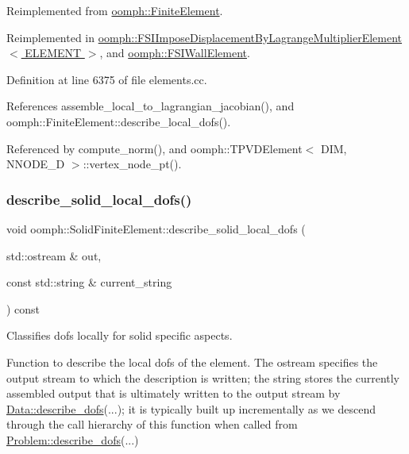 Reimplemented from \hyperlink{classoomph_1_1FiniteElement_aad9f9ebb2996fd9c44caf34da8bc7941}{oomph\+::\+Finite\+Element}.



Reimplemented in \hyperlink{classoomph_1_1FSIImposeDisplacementByLagrangeMultiplierElement_ad53849f509cfd0d3eb469bfacf7cfabf}{oomph\+::\+F\+S\+I\+Impose\+Displacement\+By\+Lagrange\+Multiplier\+Element$<$ E\+L\+E\+M\+E\+N\+T $>$}, and \hyperlink{classoomph_1_1FSIWallElement_afe120348dddfc3acfd95e7d08c2d0a1d}{oomph\+::\+F\+S\+I\+Wall\+Element}.



Definition at line 6375 of file elements.\+cc.



References assemble\+\_\+local\+\_\+to\+\_\+lagrangian\+\_\+jacobian(), and oomph\+::\+Finite\+Element\+::describe\+\_\+local\+\_\+dofs().



Referenced by compute\+\_\+norm(), and oomph\+::\+T\+P\+V\+D\+Element$<$ D\+I\+M, N\+N\+O\+D\+E\+\_\+D $>$\+::vertex\+\_\+node\+\_\+pt().

\mbox{\label{classoomph_1_1SolidFiniteElement_a1892091d7e876725a70b34cd5d91b861}} 
\subsubsection{\texorpdfstring{describe\+\_\+solid\+\_\+local\+\_\+dofs()}{describe\_solid\_local\_dofs()}}
{\footnotesize\ttfamily void oomph\+::\+Solid\+Finite\+Element\+::describe\+\_\+solid\+\_\+local\+\_\+dofs (\begin{DoxyParamCaption}\item[{std\+::ostream \&}]{out,  }\item[{const std\+::string \&}]{current\+\_\+string }\end{DoxyParamCaption}) const\hspace{0.3cm}{\ttfamily [protected]}}



Classifies dofs locally for solid specific aspects. 

Function to describe the local dofs of the element. The ostream specifies the output stream to which the description is written; the string stores the currently assembled output that is ultimately written to the output stream by \hyperlink{classoomph_1_1Data_a2dae16e2dcff9a40029f834c83364df5}{Data\+::describe\+\_\+dofs}(...); it is typically built up incrementally as we descend through the call hierarchy of this function when called from \hyperlink{classoomph_1_1Problem_abc103804eb319ae0b3d43870cc3e1eaf}{Problem\+::describe\+\_\+dofs}(...) 

